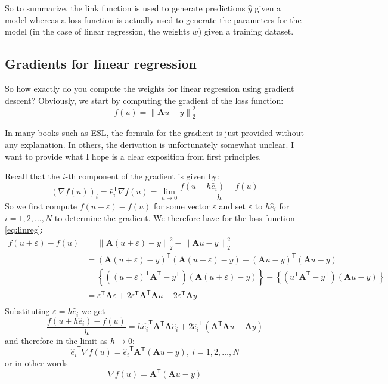 \documentclass[12pt]{article}
\newcommand{\trans}[1]{\ensuremath{#1}^{\mathsf{T}}}
\begin{document}
So to summarize, the link function is used to generate predictions
$\hat{y}$ given a model whereas a loss function is actually used to
generate the parameters for the model (in the case of linear
regression, the weights $w$) given a training dataset.

\subsection{Gradients for linear regression}

So how exactly do you compute the weights for linear regression using
gradient descent? Obviously, we start by computing the gradient of the loss function:
\begin{equation}
  \label{eq:linreg}
  f(u) = \left\|\mathbf{A} u - y\right\|^2_2
\end{equation}

In many books such as ESL, the formula for the gradient is just
provided without any explanation. In others, the derivation is
unfortunately somewhat unclear. I want to provide what I hope is a
clear exposition from first principles.

Recall that the $i$-th component of the gradient is given by:
\[
(\nabla f(u))_i = \hat{e}^{\mathsf{T}}_i \nabla f(u) = \lim_{h\to0}\frac{f(u+h\hat{e}_i) - f(u)}{h}
\]
So we first compute $f(u+\varepsilon) - f(u)$ for some vector
$\varepsilon$ and set $\varepsilon$ to $h\hat{e}_i$ for
$i=1,2,\ldots,N$ to determine the gradient. We therefore have for the loss function \eqref{eq:linreg}:
\[
\begin{aligned}
  f(u + \varepsilon) - f(u) &=  \left\|\mathbf{A} (u + \varepsilon) - y\right\|^2_2 - \left\|\mathbf{A} u - y\right\|^2_2\\
  &= \left(\mathbf{A} (u + \varepsilon) - y\right)^{\mathsf{T}} \left(\mathbf{A} (u + \varepsilon) - y\right) - \left(\mathbf{A} u - y\right)^{\mathsf{T}}  \left(\mathbf{A} u - y\right) \\
  &= \left\{\left(\trans{(u+\varepsilon)}\trans{\mathbf{A}}-\trans{y}\right)\left(\mathbf{A}(u+\varepsilon)-y\right)\right\} - \left\{\left(\trans{u}\trans{\mathbf{A}}-\trans{y}\right)\left(\mathbf{A}u - y\right)\right\} \\
  &= \trans{\varepsilon}\mathbf{A}\varepsilon + 2\trans{\varepsilon}\trans{\mathbf{A}}\mathbf{A}u - 2\trans{\varepsilon}\mathbf{A}y \\
\end{aligned}
\]
Substituting $\varepsilon = h\hat{e}_i$ we get
\[
\frac{f(u+h\hat{e}_i)-f(u)}{h} = h\trans{\hat{e_i}}\trans{\mathbf{A}}\mathbf{A}\hat{e}_i + 2 \trans{\hat{e}_i}\left(\trans{\mathbf{A}}\mathbf{A}u - \mathbf{A}y\right)
\]
and therefore in the limit as $h\to0$:
\[
\trans{\hat{e}_i}\nabla{f}(u) = \trans{\hat{e}_i}\trans{\mathbf{A}}\left(\mathbf{A}u - y\right),\ i=1,2,\ldots, N
\]
or in other words
\begin{equation}
\nabla{f}(u) = \trans{\mathbf{A}}\left(\mathbf{A}u - y\right)
\end{equation}
\end{document}

